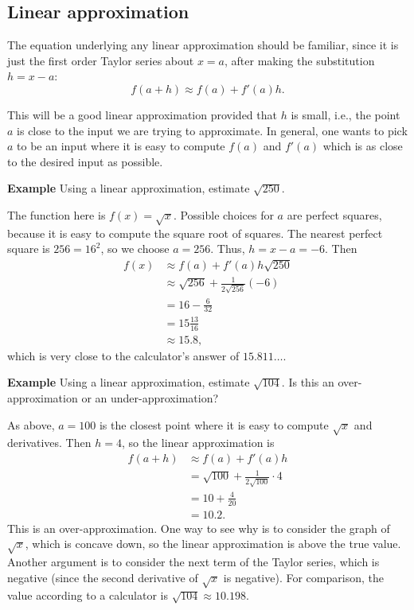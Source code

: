 \documentclass[twoside,openright,titlepage,a4paper]{book}
\begin{document}
\begin{sloppypar}
\subsection{Linear approximation}

The equation underlying any linear approximation should be familiar, since it is just the first order Taylor series about $x=a$, after making the substitution $h = x-a$: \[ f(a+h) \approx f(a) + f'(a)h. \]

This will be a good linear approximation provided that $h$ is small, i.e., the point $a$ is close to the input we are trying to approximate. In general, one wants to pick $a$ to be an input where it is easy to compute $f(a)$ and $f'(a)$ which is as close to the desired input as possible.

\textbf{Example} Using a linear approximation, estimate $\sqrt{250}$.
\begin{examplebox}
The function here is $f(x) = \sqrt{x}$. Possible choices for $a$ are perfect squares, because it is easy to compute the square root of squares. The nearest perfect square is $256 = 16^2$, so we choose $a = 256$. Thus, $h = x-a = -6$. Then
\begin{align*}
f(x) &\approx f(a) + f'(a)h \sqrt{ 250 } \\
&\approx \sqrt{256} + \frac{1}{2\sqrt{256}}(-6) \\
&= 16 - \frac{6}{32} \\
&= 15 \frac{13}{16} \\
& \approx 15.8,
\end{align*}
which is very close to the calculator's answer of $15.811 \ldots $.	
\end{examplebox}

\textbf{Example} Using a linear approximation, estimate $\sqrt{104}$. Is this an over-approximation or an under-approximation?
\begin{examplebox}	
As above, $a=100$ is the closest point where it is easy to compute $\sqrt{x}$ and derivatives. Then $h = 4$, so the linear approximation is
\begin{align*}
f(a + h) &\approx f(a) + f'(a)h \\
&= \sqrt{100} + \frac{1}{2\sqrt{100}} \cdot 4 \\
&= 10 + \frac{4}{20} \\
&= 10.2.
\end{align*}
This is an over-approximation. One way to see why is to consider the graph of $\sqrt{x}$, which is concave down, so the linear approximation is above the true value. Another argument is to consider the next term of the Taylor series, which is negative (since the second derivative of $\sqrt{x}$ is negative).
For comparison, the value according to a calculator is $\sqrt{104} \approx 10.198$.
\end{examplebox}


\end{sloppypar}
\end{document}
